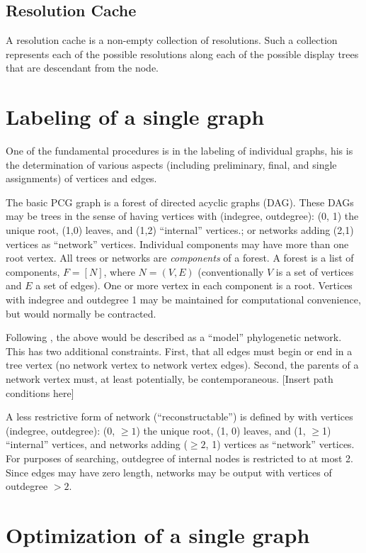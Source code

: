 \documentclass[11pt]{article}
\begin{document}
\subsection{Resolution Cache}

A resolution cache is a non-empty collection of resolutions. 
Such a collection represents each of the possible resolutions along each of the possible display trees that are descendant from the node.


\section{Labeling of a single graph} \label{Labelling of a single graph}
One of the fundamental procedures is in the labeling of individual graphs,  his is the determination of various aspects (including preliminary, final, and single assignments) of vertices and edges.   

The basic PCG graph is a forest of directed acyclic graphs (DAG). 
These DAGs may be trees in the sense of having vertices with (indegree, outdegree): (0, 1) the unique root, (1,0) leaves, and (1,2) ``internal'' vertices.; or networks adding (2,1) vertices as ``network'' vertices.
Individual components may have more than one root vertex.
All trees or networks are \textit{components} of a forest. 
A forest is a list of components, $F = [N]$, where $N = (V, E)$ (conventionally $V$ is a set of vertices and $E$ a set of edges).
One or more vertex in each component is a root. 
Vertices with indegree and outdegree 1 may be maintained for computational convenience, but would normally be contracted.
 
Following \cite{moretetal2004}, the above would be described as a ``model'' phylogenetic network.
This has two additional constraints.
First, that all edges must begin or end in a tree vertex (no network vertex to network vertex edges).  
Second,  the parents of a network vertex must, at least potentially, be contemporaneous. 
[Insert path conditions here]  
 
A less restrictive form of network (``reconstructable'') is defined by \cite{moretetal2004} with vertices (indegree, outdegree): 
(0, $\ge 1$) the unique root, (1, 0) leaves, and (1, $\ge$1) ``internal'' vertices, and networks adding ($\ge 2$, 1) vertices as ``network'' vertices.  For purposes of searching, outdegree of internal nodes is restricted to at most 2. Since edges may have zero length, networks may be output with vertices of outdegree $> 2$.
 
\section{Optimization of a single graph}\label{Optimization of a single graph}
\end{document}

